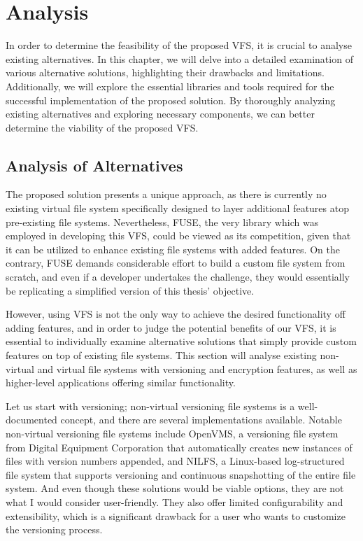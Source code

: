 \chapter{Analysis}
\label{chap:analysis}

In order to determine the feasibility of the proposed VFS, it is crucial to analyse existing alternatives.
In this chapter, we will delve into a detailed examination of various alternative solutions, highlighting their drawbacks and limitations.
Additionally, we will explore the essential libraries and tools required for the successful implementation of the proposed solution.
By thoroughly analyzing existing alternatives and exploring necessary components, we can better determine the viability of the proposed VFS\@.


\section{Analysis of Alternatives}\label{sec:alternatives}

The proposed solution presents a unique approach, as there is currently no existing virtual file system specifically designed to layer additional features atop pre-existing file systems.
Nevertheless, FUSE, the very library which was employed in developing this VFS, could be viewed as its competition, given that it can be utilized to enhance existing file systems with added features.
On the contrary, FUSE demands considerable effort to build a custom file system from scratch, and even if a developer undertakes the challenge, they would essentially be replicating a simplified version of this thesis' objective.

However, using VFS is not the only way to achieve the desired functionality off adding features, and in order to judge the potential benefits of our VFS, it is essential to individually examine alternative solutions that simply provide custom features on top of existing file systems.
This section will analyse existing non-virtual and virtual file systems with versioning and encryption features, as well as higher-level applications offering similar functionality.

Let us start with versioning; non-virtual versioning file systems is a well-documented concept, and there are several implementations available.
Notable non-virtual versioning file systems include OpenVMS, a versioning file system from Digital Equipment Corporation that automatically creates new instances of files with version numbers appended, and NILFS, a Linux-based log-structured file system that supports versioning and continuous snapshotting of the entire file system.
And even though these solutions would be viable options, they are not what I would consider user-friendly.
They also offer limited configurability and extensibility, which is a significant drawback for a user who wants to customize the versioning process.

